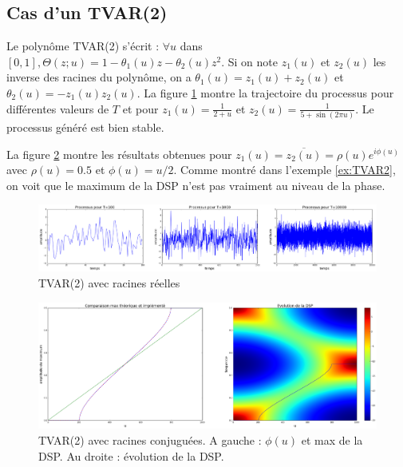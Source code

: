 \documentclass{report}
\begin{document}
\subsection{Cas d'un TVAR(2)}
Le polynôme TVAR(2) s'écrit : $\forall u$ dans $[0,1], \Theta(z;u) = 1 - \theta_1(u) z - \theta_2(u) z^2$.
Si on note $z_1(u)$ et $z_2(u)$ les inverse des racines du polynôme, on a 
$\theta_1(u) = z_1(u) + z_2(u)$ et $\theta_2(u) = -z_1(u) z_2(u)$. La figure
\ref{fig:TVAR2_reelle} montre la trajectoire du processus pour différentes valeurs de $T$ et pour $z_1(u) = \frac{1}{2 + u}$ et $z_2(u) = \frac{1}{5 + \sin(2 \pi u)}$. Le processus généré est bien stable. 

La figure \ref{fig:TVAR2_conjuguees} montre les résultats obtenues pour $z_1(u) = \overline{z_2(u)}=\rho(u)e^{i\phi(u)}$ avec $\rho(u)=0.5$ et $\phi(u)=u/2$. Comme montré dans l'exemple \ref{ex:TVAR2}, on voit que le maximum de la DSP n'est pas vraiment au niveau de la phase. 

\begin{figure}[h]
\includegraphics[scale=0.3]{presentation/images/TVAR2_racines_reelles.png}
\caption{TVAR(2) avec racines réelles}
\label{fig:TVAR2_reelle}
\end{figure}

\begin{figure}[h]
\includegraphics[scale=0.3]{presentation/images/TVAR2_racines_conjuguees.png}
\caption{TVAR(2) avec racines conjuguées. A gauche : $\phi(u)$ et max de la DSP. Au droite : évolution de la DSP.}
\label{fig:TVAR2_conjuguees}
\end{figure}


\pagebreak
{}
{}


\end{document}
